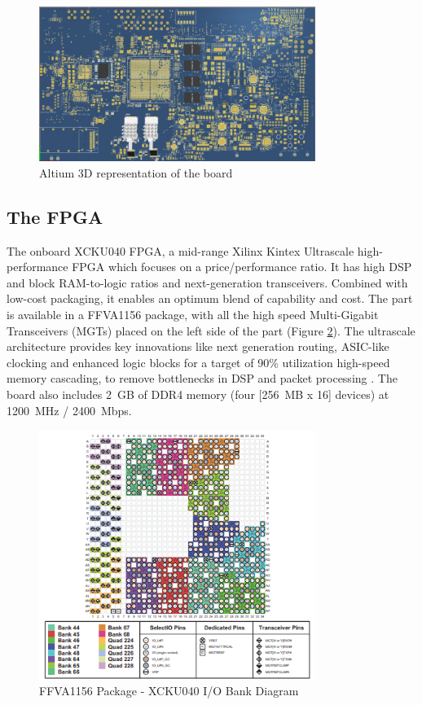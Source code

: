 \documentclass[a4paper]{PoS}
\begin{document}
\begin{figure}[h]
\centering
\includegraphics[width=0.8\textwidth]{board_3D_altium.png}
\caption{Altium 3D representation of the board}
\label{fig1}
\end{figure}



\subsection{The FPGA}
The onboard XCKU040 FPGA, a  mid-range Xilinx Kintex Ultrascale high-performance FPGA which focuses on a price/performance ratio. It has high DSP and block RAM-to-logic ratios and next-generation transceivers. Combined with low-cost packaging, it enables an optimum blend of capability and cost. The part is available in a FFVA1156 package, with all the high speed Multi-Gigabit Transceivers (MGTs)  placed on the left side of the part (Figure \ref{xcku040}). The ultrascale architecture provides key innovations like next generation routing, ASIC-like clocking and enhanced logic blocks for a target of 90\% utilization high-speed memory cascading, to remove bottlenecks in DSP and packet processing \cite{mehta2013xilinx}.
The board also includes 2~GB of DDR4 memory (four [256~MB x 16] devices) at 1200~MHz / 2400~Mbps.

\begin{figure}[h]
\centering
\includegraphics[width=0.8\textwidth]{xcku040_pinout.png}
\caption{FFVA1156 Package - XCKU040 I/O Bank Diagram}
\label{xcku040}
\end{figure}
\end{document}
